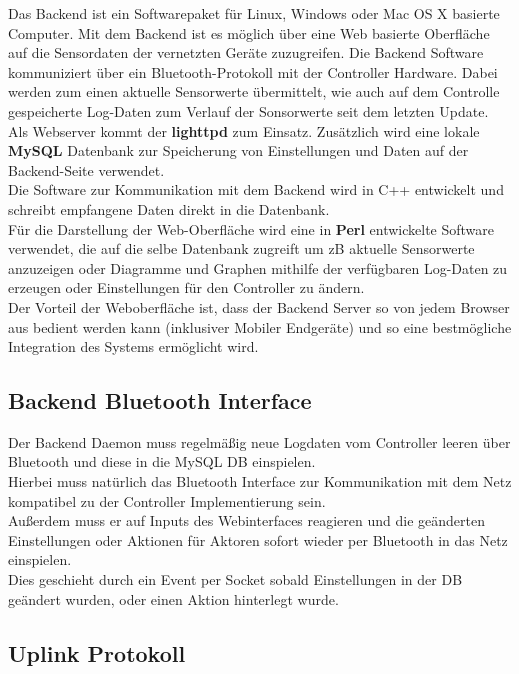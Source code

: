 \documentclass[12pt,a4paper]{article}
\begin{document}
Das Backend ist ein Softwarepaket für Linux, Windows oder Mac OS X basierte Computer. Mit dem Backend ist es möglich über eine Web basierte Oberfläche auf die Sensordaten der vernetzten Geräte zuzugreifen. Die Backend Software kommuniziert über ein Bluetooth-Protokoll mit der Controller Hardware. Dabei werden zum einen aktuelle Sensorwerte übermittelt, wie auch auf dem Controlle gespeicherte Log-Daten zum Verlauf der Sonsorwerte seit dem letzten Update.\\
Als Webserver kommt der {\bf lighttpd} zum Einsatz. Zusätzlich wird eine lokale {\bf MySQL} Datenbank zur Speicherung von Einstellungen und Daten auf der Backend-Seite verwendet.\\
Die Software zur Kommunikation mit dem Backend wird in C++ entwickelt und schreibt empfangene Daten direkt in die Datenbank.\\
Für die Darstellung der Web-Oberfläche wird eine in {\bf Perl} entwickelte Software verwendet, die auf die selbe Datenbank zugreift um zB aktuelle Sensorwerte anzuzeigen oder Diagramme und Graphen mithilfe der verfügbaren Log-Daten zu erzeugen oder Einstellungen für den Controller zu ändern.\\
Der Vorteil der Weboberfläche ist, dass der Backend Server so von jedem Browser aus bedient werden kann (inklusiver Mobiler Endgeräte) und so eine bestmögliche Integration des Systems ermöglicht wird.

\subsection{Backend Bluetooth Interface}
\label{subsec:BTBackend}

Der Backend Daemon muss regelmäßig neue Logdaten vom Controller leeren über Bluetooth und diese in die MySQL DB einspielen.\\
Hierbei muss natürlich das Bluetooth Interface zur Kommunikation mit dem Netz kompatibel zu der Controller Implementierung sein.\\
Außerdem muss er auf Inputs des Webinterfaces reagieren und die geänderten Einstellungen oder Aktionen für Aktoren sofort wieder per Bluetooth in das Netz einspielen.\\
Dies geschieht durch ein Event per Socket sobald Einstellungen in der DB geändert wurden, oder einen Aktion hinterlegt wurde.\\

\subsection{Uplink Protokoll}
\end{document}
